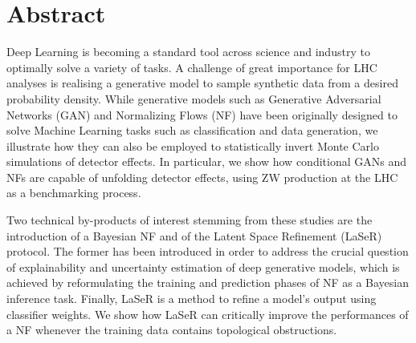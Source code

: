 %
%
\thispagestyle{empty}
%
\vspace*{1cm}
\section*{Abstract}

Deep Learning is becoming a standard tool across science and industry to optimally solve a variety of tasks.
A challenge of great importance for LHC analyses is realising a generative model to sample synthetic data from a desired probability density.
While generative models such as Generative Adversarial Networks (GAN) and Normalizing Flows (NF) have been originally designed to solve Machine Learning tasks such as classification and data generation, we illustrate how they can also be employed to statistically invert Monte Carlo simulations of detector effects. 
In particular, we show how conditional GANs and NFs are capable of unfolding detector effects, using ZW production at the LHC as a benchmarking process.

Two technical by-products of interest stemming from these studies are the introduction of a Bayesian NF and of the Latent Space Refinement (LaSeR) protocol. The former has been introduced in order to address the crucial question of explainability and uncertainty estimation of deep generative models, which is achieved by reformulating the training and prediction phases of NF as a Bayesian inference task. Finally, LaSeR is a method to refine a model's output using classifier weights. We show how LaSeR can critically improve the performances of a NF whenever the training data contains topological obstructions.

%

%
